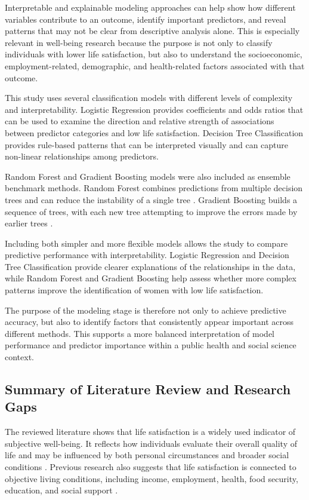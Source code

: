 \documentclass[12pt]{article}
\begin{document}
Interpretable and explainable modeling approaches can help show how different variables contribute to an outcome, identify important predictors, and reveal patterns that may not be clear from descriptive analysis alone. This is especially relevant in well-being research because the purpose is not only to classify individuals with lower life satisfaction, but also to understand the socioeconomic, employment-related, demographic, and health-related factors associated with that outcome.

This study uses several classification models with different levels of complexity and interpretability. Logistic Regression provides coefficients and odds ratios that can be used to examine the direction and relative strength of associations between predictor categories and low life satisfaction. Decision Tree Classification provides rule-based patterns that can be interpreted visually and can capture non-linear relationships among predictors.

Random Forest and Gradient Boosting models were also included as
ensemble benchmark methods. Random Forest combines predictions from
multiple decision trees and can reduce the instability of a single tree
\citep{breiman2001}. Gradient Boosting builds a sequence of trees, with
each new tree attempting to improve the errors made by earlier trees
\citep{friedman2001}.

Including both simpler and more flexible models allows the study to compare predictive performance with interpretability. Logistic Regression and Decision Tree Classification provide clearer explanations of the relationships in the data, while Random Forest and Gradient Boosting help assess whether more complex patterns improve the identification of women with low life satisfaction.

The purpose of the modeling stage is therefore not only to achieve predictive accuracy, but also to identify factors that consistently appear important across different methods. This supports a more balanced interpretation of model performance and predictor importance within a public health and social science context.

\subsection{Summary of Literature Review and Research Gaps}

The reviewed literature shows that life satisfaction is a widely used indicator of subjective well-being. It reflects how individuals evaluate their overall quality of life and may be influenced by both personal circumstances and broader social conditions \citep{diener1984, diener1999, diener2013}. Previous research also suggests that life satisfaction is connected to objective living conditions, including income, employment, health, food security, education, and social support \citep{kahneman2010, clark1994, tarasuk2023}.
\end{document}
